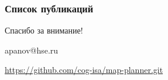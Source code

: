 \documentclass[default]{beamer}
\begin{document}
	\begin{frame}
		\frametitle{Список публикаций}
		
		\nocite{*}
		\printbibliography[keyword={fulllist}, resetnumbers=true]
	\end{frame}	
				
	\begin{frame}
		\centering
		\Huge
		Спасибо за внимание!
		\normalsize
		\par\bigskip
		\par\bigskip
		\par\bigskip
		apanov@hse.ru
		\par\bigskip
		\url{https://github.com/cog-isa/map-planner.git}
	\end{frame}			
\end{document}
